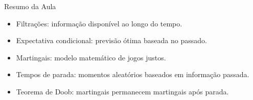 \documentclass{beamer}
\begin{document}
\begin{frame}{Resumo da Aula}
\begin{itemize}
    \item Filtrações: informação disponível ao longo do tempo.
    \item Expectativa condicional: previsão ótima baseada no passado.
    \item Martingais: modelo matemático de jogos justos.
    \item Tempos de parada: momentos aleatórios baseados em informação passada.
    \item Teorema de Doob: martingais permanecem martingais após parada.
\end{itemize}
\end{frame}
\end{document}
